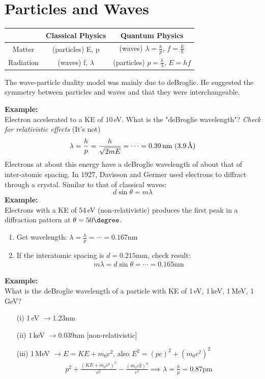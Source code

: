 \documentclass[a4paper, 11pt, normalem]{report}
\begin{document}
\section{Particles and Waves}
\begin{table}[H]
    \centering
    \begin{tabular}{|c|c|c|}
        \hline
        \rowcolor{lightgray} & Classical Physics & Quantum Physics \\
        \hline
        Matter & (particles) E, p & (waves) $\lambda = \frac{h}{p}$, $f = \frac{E}{h}$ \\
        \hline
        Radiation & (waves) f, $\lambda$ & (particles) $p = \frac{h}{\lambda}$, $E = hf$\\
        \hline
    \end{tabular} 
\end{table}
The wave-particle duality model was mainly due to deBroglie.
He suggested the symmetry between particles and waves and that they were interchangeable.

\textbf{Example:}\\
Electron accelerated to a KE of 10\,eV.
What is the "deBroglie wavelength"?
\emph{Check for relativistic effects} (It's not)
\begin{equation}
    \lambda = \frac{h}{p} = \frac{h}{\sqrt{2mE}} = \cdots = 0.39\,\text{nm}~(3.9\,\text{\r{A}})
\end{equation}
Electrons at about this energy have a deBroglie wavelength of about that of inter-atomic spacing.
In 1927, Davisson and Germer used electrons to diffract through a crystal.
Similar to that of classical waves:
\begin{equation}
    d\sin{\theta} = m\lambda
\end{equation}
\textbf{Example:}\\
Electrons with a KE of 54\,eV (non-relativistic) produces the first peak in a diffraction pattern at $\theta = 50\degree$.
\begin{enumerate}
    \item Get wavelength: $\lambda = \frac{h}{p} = \cdots = 0.167$nm 
    \item If the interatomic spacing is $d = 0.215$mm, check result:
        \begin{align}
            m\lambda = d\sin{\theta} = \cdots = 0.165\text{nm}
        \end{align}
\end{enumerate}
\textbf{Example:}\\
What is the deBroglie wavelength of a particle with KE of 1\,eV, 1\,keV, 1\,MeV, 1\,GeV?
\begin{enumerate}
    \item[(i)] 1\,eV $\rightarrow 1.23$nm
    \item[(ii)] 1\,keV $\rightarrow 0.039$nm [non-relativistic] 
    \item[(iii)] 1\,MeV $\rightarrow E = KE + m_{0}c^{2}$, also $E^{2} = (pc)^{2} + (m_{0}c^{2})^{2}$
        \begin{align}
            p^{2} + \frac{(KE + m_{0}c^{2})^{2}}{c^{2}} - \frac{(m_{0}c{2})^{2}}{c^{2}} \implies \lambda = \frac{h}{p} = 0.87\text{pm}
        \end{align}
\end{enumerate}
\end{document}
